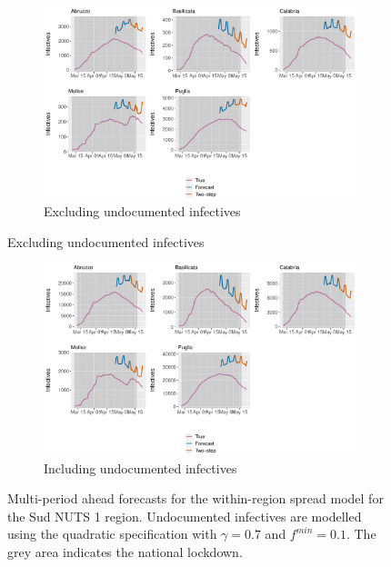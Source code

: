 \documentclass[12pt]{article}
\begin{document}
\begin{appendices}
        \begin{figure}[H]
    	    \centering
    	    \begin{subfigure}{\textwidth}
    	      \centering
    	      \includegraphics[width=0.94\linewidth]{output/model_within_lag14_forecast_full_Sud.pdf}
    	      \caption{Excluding undocumented infectives}
    	      \label{fig:forecast_full_within_sud_regular}
    	    \end{subfigure}
        \end{figure}
        \begin{figure}[H]\ContinuedFloat
    	    \begin{subfigure}{\textwidth}
    	      \centering
    	      \includegraphics[width=0.94\linewidth]{output/model_within_lag14_forecast_full_Sud_UndocQuadratic.pdf}
    	      \caption{Including undocumented infectives}
    	      \label{fig:forecast_full_within_sud_undoc}
    	    \end{subfigure}
    	    \caption{Multi-period ahead forecasts for the within-region spread model for the Sud NUTS 1 region. Undocumented infectives are modelled using the quadratic specification with $\gamma = 0.7$ and $f^{min}=0.1$. The grey area indicates the national lockdown.}
    	    \label{fig:forecast_full_within_sud}
        \end{figure}
        

\end{appendices}
\end{document}
